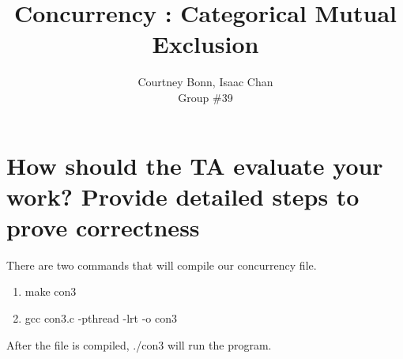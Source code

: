 \documentclass[letterpaper,10pt,draftclsnofoot,onecolumn,titlepage]{IEEEtran}
\def\name{Courtney Bonn, Isaac Chan}
\def\grp{Group \#39}
\begin{document}
\title{Concurrency : Categorical Mutual Exclusion}
\author{\name \\ \grp}

\maketitle


\section{ How should the TA evaluate your work? Provide detailed steps to prove correctness} 

There are two commands that will compile our concurrency file. 

\begin{enumerate}
	\item make con3
	\item gcc con3.c -pthread -lrt -o con3
\end{enumerate}

After the file is compiled, ./con3 will run the program.
\end{document}
